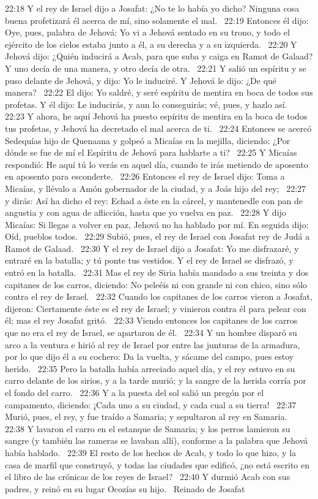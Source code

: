 22:18 Y el rey de Israel dijo a Josafat: ¿No te lo había yo dicho? Ninguna cosa buena profetizará él acerca de mí, sino solamente el mal.  
22:19 Entonces él dijo: Oye, pues, palabra de Jehová: Yo vi a Jehová sentado en su trono, y todo el ejército de los cielos estaba junto a él, a su derecha y a su izquierda.  
22:20 Y Jehová dijo: ¿Quién inducirá a Acab, para que suba y caiga en Ramot de Galaad? Y uno decía de una manera, y otro decía de otra.  
22:21 Y salió un espíritu y se puso delante de Jehová, y dijo: Yo le induciré. Y Jehová le dijo: ¿De qué manera?  
22:22 El dijo: Yo saldré, y seré espíritu de mentira en boca de todos sus profetas. Y él dijo: Le inducirás, y aun lo conseguirás; vé, pues, y hazlo así.  
22:23 Y ahora, he aquí Jehová ha puesto espíritu de mentira en la boca de todos tus profetas, y Jehová ha decretado el mal acerca de ti.  
22:24 Entonces se acercó Sedequías hijo de Quenaana y golpeó a Micaías en la mejilla, diciendo: ¿Por dónde se fue de mí el Espíritu de Jehová para hablarte a ti?  
22:25 Y Micaías respondió: He aquí tú lo verás en aquel día, cuando te irás metiendo de aposento en aposento para esconderte.  
22:26 Entonces el rey de Israel dijo: Toma a Micaías, y llévalo a Amón gobernador de la ciudad, y a Joás hijo del rey;  
22:27 y dirás: Así ha dicho el rey: Echad a éste en la cárcel, y mantenedle con pan de angustia y con agua de aflicción, hasta que yo vuelva en paz.  
22:28 Y dijo Micaías: Si llegas a volver en paz, Jehová no ha hablado por mí. En seguida dijo: Oíd, pueblos todos.  
22:29 Subió, pues, el rey de Israel con Josafat rey de Judá a Ramot de Galaad.  
22:30 Y el rey de Israel dijo a Josafat: Yo me disfrazaré, y entraré en la batalla; y tú ponte tus vestidos. Y el rey de Israel se disfrazó, y entró en la batalla.  
22:31 Mas el rey de Siria había mandado a sus treinta y dos capitanes de los carros, diciendo: No peleéis ni con grande ni con chico, sino sólo contra el rey de Israel.  
22:32 Cuando los capitanes de los carros vieron a Josafat, dijeron: Ciertamente éste es el rey de Israel; y vinieron contra él para pelear con él; mas el rey Josafat gritó.  
22:33 Viendo entonces los capitanes de los carros que no era el rey de Israel, se apartaron de él.  
22:34 Y un hombre disparó su arco a la ventura e hirió al rey de Israel por entre las junturas de la armadura, por lo que dijo él a su cochero: Da la vuelta, y sácame del campo, pues estoy herido.  
22:35 Pero la batalla había arreciado aquel día, y el rey estuvo en su carro delante de los sirios, y a la tarde murió; y la sangre de la herida corría por el fondo del carro.  
22:36 Y a la puesta del sol salió un pregón por el campamento, diciendo: ¡Cada uno a su ciudad, y cada cual a su tierra!  
22:37 Murió, pues, el rey, y fue traído a Samaria; y sepultaron al rey en Samaria.  
22:38 Y lavaron el carro en el estanque de Samaria; y los perros lamieron su sangre (y también las rameras se lavaban allí), conforme a la palabra que Jehová había hablado.  
22:39 El resto de los hechos de Acab, y todo lo que hizo, y la casa de marfil que construyó, y todas las ciudades que edificó, ¿no está escrito en el libro de las crónicas de los reyes de Israel?  
22:40 Y durmió Acab con sus padres, y reinó en su lugar Ocozías su hijo.  
Reinado de Josafat  

